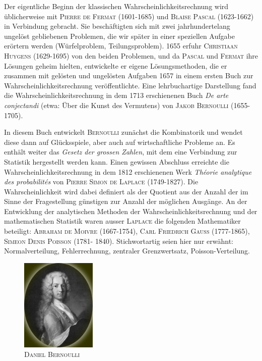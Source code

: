 \documentclass[%
11pt,%
twoside,%
titlepage,%
german,%
headsepline%
]{scrartcl}
\begin{document}
Der eigentliche Beginn der klassischen Wahrscheinlichkeitsrechnung wird üblicherweise mit \textsc{Pierre de Fermat} (1601-1685) und \textsc{Blaise Pascal} (1623-1662) in Verbindung gebracht. Sie beschäftigten sich mit zwei jahrhundertelang ungelöst gebliebenen Problemen, die wir später in einer speziellen Aufgabe erörtern werden (Würfelproblem, Teilungsproblem). 1655 erfuhr \textsc{Christiaan Huygens} (1629-1695) von den beiden Problemen, und da \textsc{Pascal} und \textsc{Fermat} ihre Lösungen geheim hielten, entwickelte er eigene Lösungsmethoden, die er zusammen mit gelösten und ungelösten Aufgaben 1657 in einem ersten Buch zur Wahrscheinlichkeitsrechnung veröffentlichte. Eine lehrbuchartige Darstellung fand die Wahrscheinlichkeitsrechnung in dem 1713 erschienenen Buch \emph{De arte conjectandi} (etwa: Über die Kunst des Vermutens) von \textsc{Jakob Bernoulli} (1655-1705).

In diesem Buch entwickelt \textsc{Bernoulli} zunächst die Kombinatorik und wendet diese dann auf Glücksspiele, aber auch auf wirtschaftliche Probleme an. Es enthält weiter das \emph{Gesetz der grossen Zahlen}, mit dem eine Verbindung zur Statistik hergestellt werden kann. Einen gewissen Abschluss erreichte die Wahrscheinlichkeitsrechnung in dem 1812 erschienenen Werk \emph{Théorie analytique des probabilités} von \textsc{Pierre Simon de Laplace} (1749-1827). Die Wahrscheinlichkeit wird dabei definiert als der Quotient aus der Anzahl der im Sinne der Fragestellung günstigen zur Anzahl der möglichen Ausgänge. An der Entwicklung der analytischen Methoden der Wahrscheinlichkeitsrechnung und der mathematischen Statistik waren ausser \textsc{Laplace} die folgenden Mathematiker beteiligt: \textsc{Abraham de Moivre} (1667-1754), \textsc{Carl Friedrich Gauss} (1777-1865), \textsc{Simeon Denis Poisson} (1781- 1840). Stichwortartig seien hier nur erwähnt: Normalverteilung, Fehlerrechnung, zentraler Grenzwertsatz, Poisson-Verteilung.
\begin{figure}
\centering
\includegraphics[width=0.32\textwidth]{pictures/bernoulli}
\caption{\textsc{Daniel Ber\-noul\-li}}
\end{figure}
\end{document}
